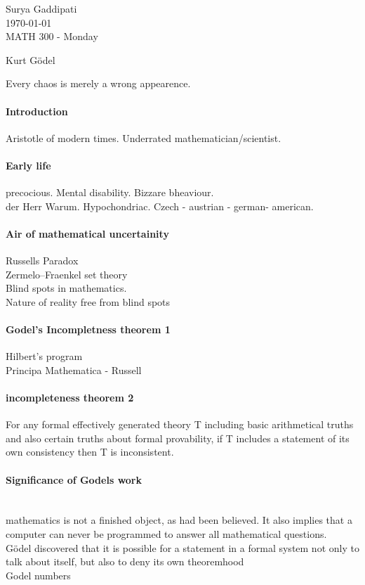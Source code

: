 \documentclass[12pt]{article}
\begin{document}
 

\noindent Surya Gaddipati\\
\today\\
MATH 300 - Monday

\begin{center}
  Kurt G{\"o}del
\end{center}

\begin{center}
Every chaos is merely a wrong appearence. 
\end{center}
 \paragraph{Introduction}
 Aristotle of modern times. Underrated mathematician/scientist. 
 \paragraph{Early life}
 precocious. Mental disability. Bizzare bheaviour.\\
 der Herr Warum. Hypochondriac.
 Czech - austrian - german- american. \\
 \paragraph{Air of mathematical uncertainity}
 Russells Paradox\\
 Zermelo–Fraenkel set theory\\
 Blind spots in mathematics.\\
 Nature of reality free from blind spots\\
 \paragraph{Godel's Incompletness theorem 1}
 Hilbert's program \\
 Principa Mathematica - Russell\\
 \paragraph {incompleteness theorem 2}
 For any formal effectively generated theory T including basic arithmetical truths and also certain truths about formal provability, if T includes a statement of its own consistency then T is inconsistent.\\
 \paragraph{Significance of Godels work}
 \\
 mathematics is not a finished object, as had been believed. It also implies that a computer can never be programmed to answer all mathematical questions.\\
 Gödel discovered that it is possible for a statement in a formal system not only to talk about itself, but also to deny its own theoremhood \\
 Godel numbers\\
\end{document}
